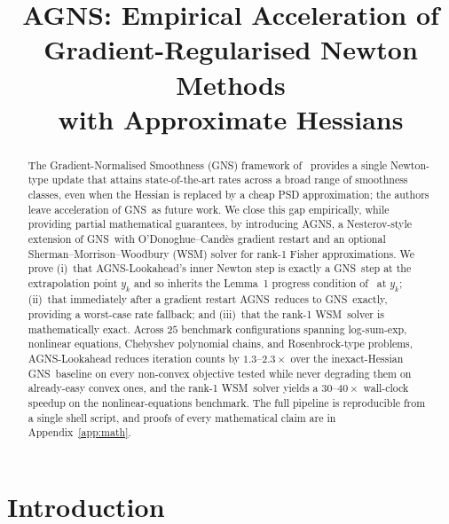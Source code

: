 \documentclass[conference]{IEEEtran}
\theoremstyle{remark}
\newcommand{\AGNS}{\textsc{AGNS}}
\newcommand{\GNS}{\textsc{GNS}}
\newcommand{\WSM}{\textsc{WSM}}
\begin{document}
\title{\AGNS: Empirical Acceleration of\\
       Gradient-Regularised Newton Methods\\
       with Approximate Hessians}

\author{%
}

\maketitle

\begin{abstract}
The Gradient-Normalised Smoothness (\GNS) framework
of~\cite{semenov2025gradient} provides a single Newton-type update
that attains state-of-the-art rates across a broad range of smoothness
classes, even when the Hessian is replaced by a cheap PSD
approximation; the authors leave acceleration of \GNS\ as future work.
We close this gap empirically, while providing partial mathematical
guarantees, by introducing \AGNS, a Nesterov-style extension of \GNS\
with O'Donoghue--Cand\`es gradient restart and an optional
Sherman--Morrison--Woodbury (\WSM) solver for rank-1 Fisher
approximations. We prove (i)~that \AGNS-Lookahead's inner Newton step
is exactly a \GNS\ step at the extrapolation point $y_k$ and so
inherits the Lemma~1 progress condition of~\cite{semenov2025gradient}
at $y_k$; (ii)~that immediately after a gradient restart \AGNS\
reduces to \GNS\ exactly, providing a worst-case rate fallback; and
(iii)~that the rank-1 \WSM\ solver is mathematically exact. Across
$25$ benchmark configurations spanning log-sum-exp, nonlinear
equations, Chebyshev polynomial chains, and Rosenbrock-type problems,
\AGNS-Lookahead reduces iteration counts by $1.3$--$2.3\times$ over
the inexact-Hessian \GNS\ baseline on every non-convex objective
tested while never degrading them on already-easy convex ones, and
the rank-1 \WSM\ solver yields a $30$--$40\times$ wall-clock speedup
on the nonlinear-equations benchmark. The full pipeline is
reproducible from a single shell script, and proofs of every
mathematical claim are in Appendix~\ref{app:math}.
\end{abstract}

\section{Introduction}
\label{sec:intro}
\end{document}
